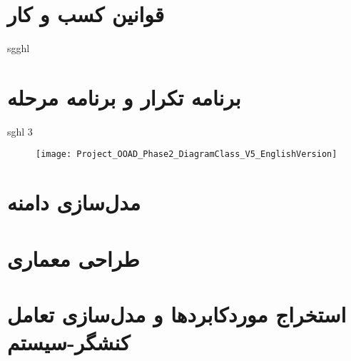 \documentclass[12pt]{article}
\begin{document}
	\section{قوانین کسب و کار}
	sgghl

	\section{برنامه تکرار و برنامه مرحله}
	sghl 3

	\begin{figure}
		\centering
		\texttt{[image: Project\_OOAD\_Phase2\_DiagramClass\_V5\_EnglishVersion]}
		\caption{}
		\label{fig:projectooadphase2diagramclassv5englishversion}
	\end{figure}



	\section{مدل‌سازی دامنه}

	\section{طراحی معماری}

	\section{استخراج موردکابردها و مدل‌سازی تعامل کنشگر-سیستم}
\end{document}
